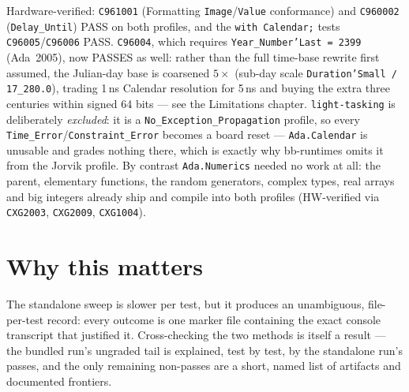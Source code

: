 Hardware-verified: \texttt{C961001} (Formatting \texttt{Image}/\texttt{Value} conformance) and
\texttt{C960002} (\texttt{Delay\_Until}) PASS on both profiles, and the \texttt{with Calendar;}
tests \texttt{C96005}/\texttt{C96006} PASS. \texttt{C96004}, which requires
\texttt{Year\_Number'Last = 2399} (Ada~2005), now PASSES as well: rather than the
full time-base rewrite first assumed, the Julian-day base is coarsened $5\times$
(sub-day scale \texttt{Duration'Small\,/\,17\_280.0}), trading 1\,ns Calendar
resolution for 5\,ns and buying the extra three centuries within signed 64 bits ---
see the Limitations chapter. \texttt{light-tasking} is deliberately
\emph{excluded}: it is a \texttt{No\_Exception\_Propagation} profile, so every
\texttt{Time\_Error}/\texttt{Constraint\_Error} becomes a board reset --- \texttt{Ada.Calendar}
is unusable and grades nothing there, which is exactly why bb-runtimes omits it from the Jorvik
profile. By contrast \texttt{Ada.Numerics} needed no work at all: the parent, elementary
functions, the random generators, complex types, real arrays and big integers already ship and
compile into both profiles (HW-verified via \texttt{CXG2003}, \texttt{CXG2009}, \texttt{CXG1004}).

\section{Why this matters}

The standalone sweep is slower per test, but it produces an unambiguous, file-per-test
record: every outcome is one marker file containing the exact console transcript that
justified it. Cross-checking the two methods is itself a result --- the bundled run's
ungraded tail is explained, test by test, by the standalone run's passes, and the only
remaining non-passes are a short, named list of artifacts and documented frontiers.

